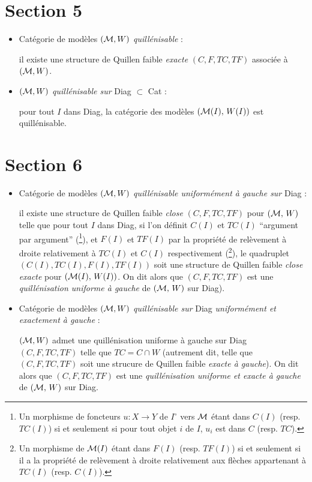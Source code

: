 \section*{Section 5}

\begin{itemize}
\item[\textbullet] Catégorie de modèles $(\mathcal{M},W)$ \textit{quillénisable} :

il existe une structure de Quillen faible \textit{exacte} $(C,F,TC,TF)$ associée à $(\mathcal{M},W)$.

\item[\textbullet] $(\mathcal{M},W)$ \textit{quillénisable sur} Diag $\subset$ Cat :

pour tout $I$ dans Diag, la catégorie des modèles $(\mathcal{M}(I),\, W(I))$ est quillénisable.
\end{itemize}

\section*{Section 6}

\begin{itemize}
\item[\textbullet] Catégorie de modèles $(\mathcal{M},W)$ \textit{quillénisable uniformément à gauche sur} Diag :

il existe une structure de Quillen faible \textit{close} $(C,F,TC,TF)$ pour $(\mathcal{M},\, W)$ telle que pour tout $I$ dans Diag, si l'on définit $C(I)$ et $TC(I)$ “argument par argument” (\footnote{Un morphisme de foncteurs $u : X \longrightarrow Y$ de $I^{\circ}$ vers $\mathcal{M}$ étant dans $C(I)$ (resp. $TC(I)$) si et seulement si pour tout objet $i$ de $I$, $u_i$ est dans $C$ (resp. $TC$).}), et $F(I)$ et $TF(I)$ par la propriété de relèvement à droite relativement à $TC(I)$ et $C(I)$ respectivement (\footnote{Un morphisme de $\mathcal{M}(I)$ étant dans $F(I)$ (resp. $TF(I)$) si et seulement si il a la propriété de relèvement à droite relativement aux flèches appartenant à $TC(I)$ (resp. $C(I)$).}), le quadruplet $(C(I),TC(I),F(I),TF(I))$ soit une structure de Quillen faible \textit{close exacte} pour $(\mathcal{M}(I),\, W(I))$. On dit alors que $(C,F,TC,TF)$ est une \textit{quillénisation uniforme à gauche} de $(\mathcal{M},\, W)$ sur Diag).
\end{itemize}


\begin{itemize}
\item[\textbullet] Catégorie de modèles $(\mathcal{M},W)$ \textit{quillénisable sur} Diag \textit{uniformément et exactement à gauche} :

$(\mathcal{M},W)$ admet une quillénisation uniforme à gauche sur Diag $(C,F,TC,TF)$ telle que $TC = C \cap W$ (autrement dit, telle que $(C,F,TC,TF)$ soit une strucure de Quillen faible \textit{exacte à gauche}). On dit alors que $(C,F,TC,TF)$ est une \textit{quillénisation uniforme et exacte à gauche} de $(\mathcal{M},\, W)$ sur Diag. %
\end{itemize}


